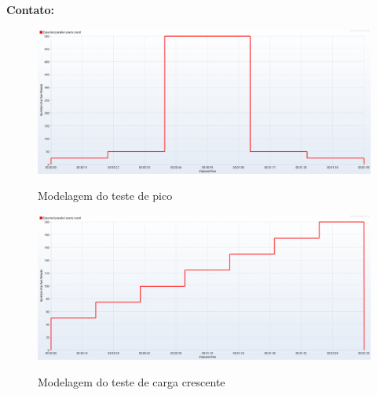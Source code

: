 \documentclass{libs/ufc_format}
\begin{document}
\begin{frame}{}
    \centering
    \huge{\textbf{}}
    
    \vspace{1cm}
    
    \Large{\textbf{Contato:}}
    \newline
    \vspace*{0.5cm}
    \large{}
\end{frame}



\begin{frame}{}
\end{frame}

\begin{frame}{}
    \begin{figure}[H]
        \centering
        \caption{Modelagem do teste de pico}
        \includegraphics[width=1\linewidth]{figuras/model-spike1-v2.pdf}
        \captionsetup{justification=centering}
        \label{fig:model-spike1}
    \end{figure}
\end{frame}

\begin{frame}{}
    \begin{figure}[H]
        \centering
        \caption{Modelagem do teste de carga crescente}
        \includegraphics[width=1\linewidth]{figuras/model-crescente-v2.pdf}
        \captionsetup{justification=centering}
        \label{fig:model-crescente}
    \end{figure}
\end{frame}
\end{document}
